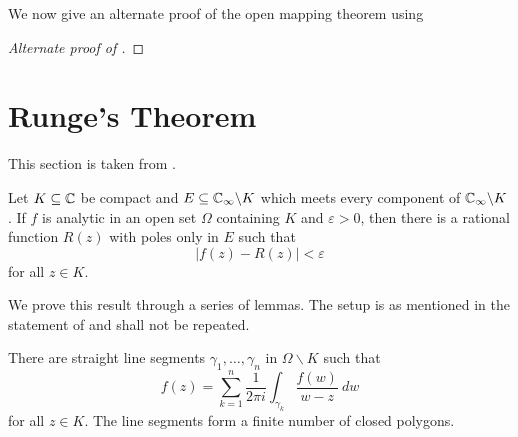 We now give an alternate proof of the open mapping theorem using 

\begin{proof}[Alternate proof of ]
\end{proof}

\newpage
\section{Runge's Theorem}

This section is taken from \cite{conway}.

\begin{theorem}
    Let $K\subseteq\mathbb{C}$ be compact and $E\subseteq\mathbb{C}_\infty\backslash K$ which meets every component of $\mathbb{C}_\infty\backslash K$. If $f$ is analytic in an open set $\Omega$ containing $K$ and $\varepsilon > 0$, then there is a rational function $R(z)$ with poles only in $E$ such that 
    \begin{equation*}
        |f(z) - R(z)| < \varepsilon
    \end{equation*}
    for all $z\in K$.
\end{theorem}

We prove this result through a series of lemmas. The setup is as mentioned in the statement of  and shall not be repeated.

\begin{lemma}
    There are straight line segments $\gamma_1,\dots,\gamma_n$ in $\Omega\backslash K$ such that 
    \begin{equation*}
        f(z) = \sum_{k = 1}^n\frac{1}{2\pi i}\int_{\gamma_k}\frac{f(w)}{w - z}~dw
    \end{equation*}
    for all $z\in K$. The line segments form a finite number of closed polygons.
\end{lemma}